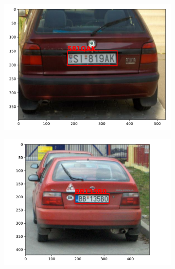 \begin{figure}
\begin{subfigure}{0.35\textwidth}
    \end{subfigure}
    \begin{subfigure}{0.35\textwidth}
        \includegraphics[width=\textwidth]{abbildungen/prediction_02.pdf}
    \end{subfigure}
    \begin{subfigure}{0.35\textwidth}
        \includegraphics[width=\textwidth]{abbildungen/prediction_01.pdf}
    \end{subfigure}
    \begin{subfigure}{0.35\textwidth}

\end{subfigure}
\end{figure}
